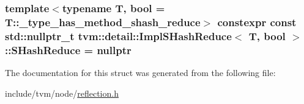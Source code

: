 \subsubsection[{\texorpdfstring{S\+Hash\+Reduce}{SHashReduce}}]{\setlength{\rightskip}{0pt plus 5cm}template$<$typename T, bool  = T\+::\+\_\+type\+\_\+has\+\_\+method\+\_\+shash\+\_\+reduce$>$ constexpr const std\+::nullptr\+\_\+t {\bf tvm\+::detail\+::\+Impl\+S\+Hash\+Reduce}$<$ T, bool $>$\+::S\+Hash\+Reduce = nullptr\hspace{0.3cm}{\ttfamily [static]}}\hypertarget{structtvm_1_1detail_1_1ImplSHashReduce_a52b81cd95647e6f528636cfc25c48310}{}\label{structtvm_1_1detail_1_1ImplSHashReduce_a52b81cd95647e6f528636cfc25c48310}


The documentation for this struct was generated from the following file\+:\begin{DoxyCompactItemize}
\item 
include/tvm/node/\hyperlink{reflection_8h}{reflection.\+h}\end{DoxyCompactItemize}
